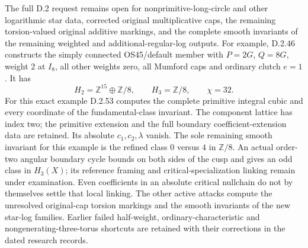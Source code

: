 The full D.2 request remains open for nonprimitive-long-circle
and other logarithmic star data, corrected original multiplicative
caps, the remaining torsion-valued original additive markings,
and the complete smooth invariants of the remaining weighted and
additional-regular-log outputs. For example, D.2.46 constructs the
simply connected OS45/default member with $P=2G$, $Q=8G$, weight
$2$ at $I_8$, all other weights zero, all Mumford caps and ordinary
clutch $e=1$. It has
\[
 H_2=\mathbb Z^{15}\oplus\mathbb Z/8,\qquad
 H_3=\mathbb Z/8,\qquad \chi=32.
\]
For this exact example D.2.53 computes the complete primitive
integral cubic and every coordinate of the fundamental-class
invariant. The component lattice has index two; the primitive
extension and the full boundary coefficient-extension data are
retained. Its absolute $c_1,c_2,\lambda$ vanish. The sole remaining
smooth invariant for this example is the refined class $0$ versus
$4$ in $\mathbb Z/8$. An actual order-two angular boundary cycle
bounds on both sides of the cusp and gives an odd class in $H_3(X)$;
its reference framing and critical-specialization linking remain
under examination. Even coefficients in an absolute critical
nullchain do not by themselves settle that local linking.
The other active attacks compute the unresolved original-cap
torsion markings and the smooth invariants of the new star-log
families. Earlier failed half-weight, ordinary-characteristic
and nongenerating-three-torus shortcuts are retained with their
corrections in the dated research records.

